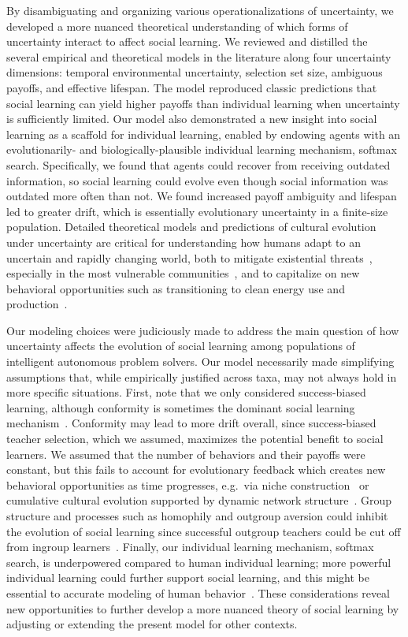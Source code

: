 \documentclass[letterpaper,11.5pt]{scrartcl}
\begin{document}
By disambiguating and organizing various operationalizations of
uncertainty, we developed a more nuanced theoretical understanding of which forms of
uncertainty interact to affect social learning.  We reviewed and distilled the several empirical and
theoretical models in the literature along four uncertainty dimensions: temporal
environmental uncertainty, selection set size, ambiguous payoffs, and effective lifespan.
The model reproduced classic predictions that social learning can yield higher payoffs
than individual learning when uncertainty is sufficiently limited. Our model also
demonstrated a new insight into social learning as a scaffold for individual learning,
enabled by endowing agents with an evolutionarily- and biologically-plausible individual
learning mechanism, softmax search. Specifically, we found that agents could recover from
receiving outdated information, so social learning could evolve even though social
information was outdated more often than not. We found increased payoff ambiguity and
lifespan led to greater drift, which is essentially evolutionary uncertainty in a
finite-size population. Detailed theoretical models and
predictions of cultural evolution under uncertainty are critical for understanding how
humans adapt to an uncertain and rapidly changing world, both to mitigate existential
threats~\cite{Moya2020,Jones2021}, especially in the most vulnerable
communities~\cite{McNamara2020}, and to capitalize on new behavioral opportunities such as
transitioning to clean energy use and
production~\cite{NatureEnergyEditorialPromisesPremises2018,Brisbois2022}.

Our modeling choices were judiciously made to address the main question of how
uncertainty affects the evolution of social learning among populations of intelligent
autonomous problem solvers.  Our model necessarily made simplifying assumptions that,
while empirically justified across taxa, may not always hold in more
specific situations. First, note that we only
considered success-biased learning, although conformity is sometimes the dominant
social learning mechanism~\cite{Muthukrishna2016a,Smaldino2018b}.
Conformity may lead to more drift overall, since success-biased teacher selection, which
we assumed, maximizes the potential benefit to social learners. We assumed that the
number of behaviors and their payoffs were constant, but this fails to account for
evolutionary feedback which creates new behavioral opportunities as time progresses, e.g.\
via niche construction~\cite{Smaldino2012a,Heras-Escribano2020} or cumulative cultural
evolution supported by dynamic network structure~\cite{Smolla2019,Derex2020}. 
Group structure and processes such as homophily
and outgroup aversion could inhibit the evolution of social learning since 
successful outgroup teachers
could be cut off from ingroup learners~\cite{Jackson2012}. Finally, our individual
learning mechanism, softmax search, is underpowered compared to human individual learning; 
more powerful individual learning could further support social learning, and
this might be essential to accurate modeling of human behavior~\cite{Schulz2020a,Wu2022}.
These considerations reveal new opportunities to further develop a more nuanced 
theory of social learning by adjusting or extending the present model for other contexts. 
\end{document}
